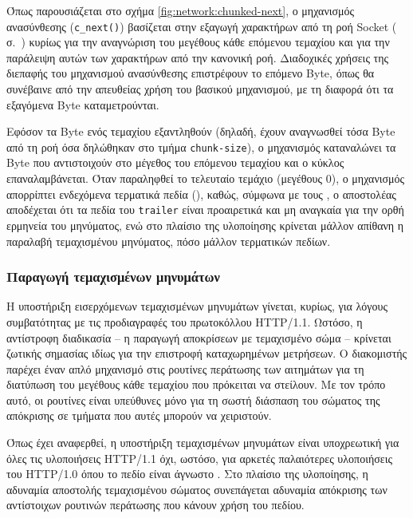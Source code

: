 Όπως παρουσιάζεται στο σχήμα
\ref{fig:network:chunked-next}, ο μηχανισμός ανασύνθεσης (\verb~c_next()~)
βασίζεται στην εξαγωγή χαρακτήρων από τη ροή Socket
( σ.~\pageref{ssubsec:network:sbuffer}) κυρίως
για την αναγνώριση του μεγέθους κάθε επόμενου τεμαχίου και για την παράλειψη
αυτών των χαρακτήρων από την κανονική ροή. Διαδοχικές χρήσεις της διεπαφής του
μηχανισμού ανασύνθεσης επιστρέφουν το επόμενο Byte, όπως θα συνέβαινε από την
απευθείας χρήση του βασικού μηχανισμού, με τη διαφορά ότι τα εξαγόμενα Byte
καταμετρούνται.

Εφόσον τα Byte ενός τεμαχίου εξαντληθούν (δηλαδή, έχουν αναγνωσθεί τόσα Byte από
τη ροή όσα δηλώθηκαν στο τμήμα \verb~chunk-size~), ο μηχανισμός καταναλώνει τα
Byte που αντιστοιχούν στο μέγεθος του επόμενου τεμαχίου και ο κύκλος
επαναλαμβάνεται. Όταν παραληφθεί το τελευταίο τεμάχιο (μεγέθους 0), ο μηχανισμός
απορρίπτει ενδεχόμενα τερματικά πεδία (), καθώς, σύμφωνα με τους
\textcite[26]{rfc2616}, ο αποστολέας αποδέχεται ότι τα πεδία του \verb~trailer~
είναι προαιρετικά και μη αναγκαία για την ορθή ερμηνεία του μηνύματος, ενώ στο
πλαίσιο της υλοποίησης κρίνεται μάλλον απίθανη η παραλαβή τεμαχισμένου
μηνύματος, πόσο μάλλον τερματικών πεδίων.


\subsubsection{Παραγωγή τεμαχισμένων μηνυμάτων}
\label{ssubsec:network:chunked-output}

Η υποστήριξη εισερχόμενων τεμαχισμένων μηνυμάτων γίνεται, κυρίως, για λόγους
συμβατότητας με τις προδιαγραφές του πρωτοκόλλου HTTP/1.1. Ωστόσο, η αντίστροφη
διαδικασία -- η παραγωγή αποκρίσεων με τεμαχισμένο σώμα -- κρίνεται ζωτικής
σημασίας ιδίως για την επιστροφή καταχωρημένων μετρήσεων.
Ο διακομιστής παρέχει έναν απλό μηχανισμό στις ρουτίνες περάτωσης των αιτημάτων
για τη διατύπωση του μεγέθους κάθε τεμαχίου που πρόκειται να στείλουν. Με τον
τρόπο αυτό, οι ρουτίνες είναι υπεύθυνες μόνο για τη σωστή διάσπαση του σώματος
της απόκρισης σε τμήματα που αυτές μπορούν να χειριστούν.

Όπως έχει αναφερθεί, η υποστήριξη τεμαχισμένων μηνυμάτων είναι υποχρεωτική για
όλες τις υλοποιήσεις HTTP/1.1 όχι, ωστόσο, για αρκετές παλαιότερες υλοποιήσεις
του HTTP/1.0 όπου το πεδίο  είναι άγνωστο
\parencite[25--26,144]{rfc2616}. Στο πλαίσιο της υλοποίησης, η αδυναμία
αποστολής τεμαχισμένου σώματος συνεπάγεται αδυναμία απόκρισης των αντίστοιχων
ρουτινών περάτωσης που κάνουν χρήση του πεδίου.


